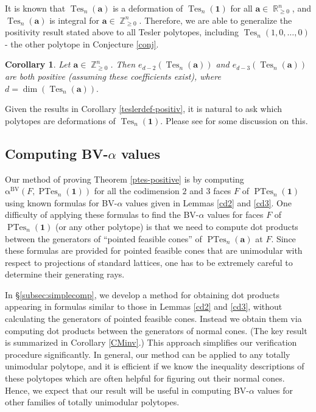 \documentclass[12pt]{amsart}
\numberwithin{equation}{section}
\newtheorem{cor}[thm]{Corollary}
\theoremstyle{definition}
\def\tes{\operatorname{Tes}}
\def\ptes{\operatorname{PTes}}
\def\1{{\boldsymbol{1}}}
\def\ba{{\boldsymbol{a}}}
\def\bvalpha{\operatorname{\alpha^{BV}}}
\def\Z{\operatorname{\mathbb{Z}}}
\def\R{\operatorname{\mathbb{R}}}
\begin{document}
It is known that $\tes_{n}(\ba)$ is a deformation of $\tes_{n}(\boldsymbol{1})$ for all $\ba \in \R_{\geq 0}^{n}$, and $\tes_n(\ba)$ is integral for $\ba \in \Z_{\ge 0}^n.$ Therefore, we are able to generalize the positivity result stated above to all Tesler polytopes, including $\tes_{n}(1,0,\dots,0)$ - the other polytope in Conjecture \ref{conj}.
\begin{cor}\label{cor:tesler}
  Let $\ba \in \Z_{\ge 0}^n$. Then $e_{d-2}(\tes_n(\ba))$ and $e_{d-3}(\tes_n(\ba))$ are both positive (assuming these coefficients exist), where $d = \dim(\tes_n(\ba)).$
\end{cor}
  
Given the results in Corollary \ref{teslerdef-positiv}, it is natural to ask which polytopes are deformations of $\tes_{n}(\boldsymbol{1})$. Please see \cite[Section 4]{teslerv1} for some discussion on this.

	\subsection{Computing BV-$\alpha$ values}
Our method of proving Theorem \ref{ptes-positive} is by computing $\bvalpha(F,\ptes_n(\1))$ for all the codimension $2$ and $3$ faces $F$ of $\ptes_n(\1)$ using known formulas for BV-$\alpha$ values given in Lemmas \ref{cd2} and \ref{cd3}. 
One difficulty of applying these formulas to find the BV-$\alpha$ values for faces $F$ of $\ptes_{n}(\1)$ (or any other polytope) is that we need to compute dot products between the generators of ``pointed feasible cones'' of $\ptes_{n}(\ba)$ at $F$. Since these formulas are provided for pointed feasible cones that are unimodular with respect to projections of standard lattices, one has to be extremely careful to determine their generating rays.

In \S \ref{subsec:simplecomp}, we develop a method for obtaining dot products appearing in formulas similar to those in Lemmas \ref{cd2} and \ref{cd3}, without calculating the generators of pointed feasible cones. Instead we obtain them via computing dot products between the generators of normal cones. (The key result is summarized in Corollary \ref{CMinv}.) This approach simplifies our verification procedure significantly. In general, our method can be applied to any totally unimodular polytope, and it is efficient if we know the inequality descriptions of these polytopes which are often helpful for figuring out their normal cones. Hence, we expect that our result will be useful in computing BV-$\alpha$ values for other families of totally unimodular polytopes.  
\end{document}
